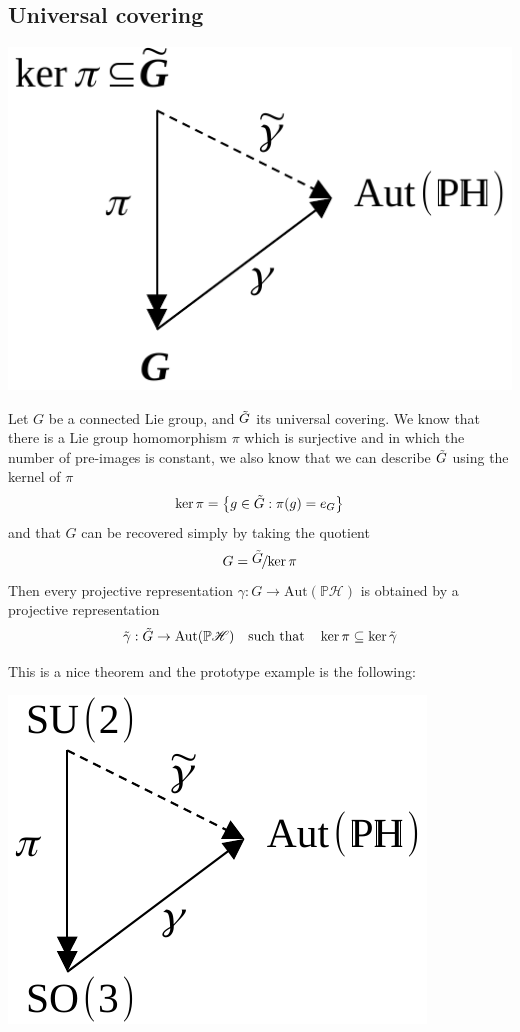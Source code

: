 \documentclass[../main.tex]{subfiles}
\begin{document}
\subsection{Universal covering}
\begin{marginfigure}
	\includegraphics[width=1.1\linewidth]{images/teorem_universal_covering.pdf}
	\caption*{}
\end{marginfigure}
\begin{theorem}
Let $G$ be a connected Lie group, and $\Tilde{G}$ its universal covering. We know that there is a Lie group homomorphism $\pi$ which is surjective and in which the number of pre-images is constant, we also know that we can describe $\Tilde{G}$ using the kernel of $\pi$
\[
\ker\pi=\left\{g\in\Tilde{G}:\pi(g)=e_{G}\right\}
\]
and that $G$ can be recovered simply by taking the quotient
\[
G=\nicefrac{\displaystyle\Tilde{G}}{\displaystyle\ker\pi}
\]
Then every projective representation $\gamma:G\to\textrm{Aut}(\mathbb{P}\mathcal{H})$ is obtained by a projective representation
\[
\Tilde{\gamma}:\Tilde{G}\to\textrm{Aut}(\mathbb{P}\mathcal{H})\quad \textrm{such that}\quad \ker\pi\subseteq\ker\Tilde{\gamma}
\]
\end{theorem}
This is a nice theorem and the prototype example is the following:
\begin{marginfigure}
	\includegraphics[width=1.1\linewidth]{images/ex_teorem_universal_covering.pdf}
	\caption*{}
\end{marginfigure}
\end{document}
